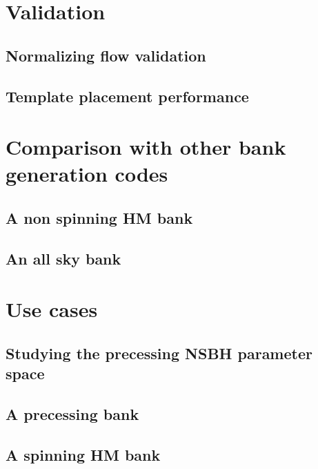 \documentclass[twocolumn,showpacs,preprintnumbers,nofootinbib,prd,
superscriptaddress,10pt]{revtex4-2}
\begin{document}
\section{Validation} \label{sec:validation}

\subsection{Normalizing flow validation} \label{sec:flow_validation}

\subsection{Template placement performance} \label{sec:template_placement}

\section{Comparison with other bank generation codes} \label{sec:other_methods}

\subsection{A non spinning HM bank} \label{sec:HM_comparison}

\subsection{An all sky bank} \label{sec:all_sky_comparison}

\section{Use cases} \label{sec:use_cases}

\subsection{Studying the precessing NSBH parameter space} \label{sec:NSBH}

\subsection{A precessing bank} \label{sec:precessing_bank}

\subsection{A spinning HM bank} \label{sec:HM_spinning_bank}
\end{document}
